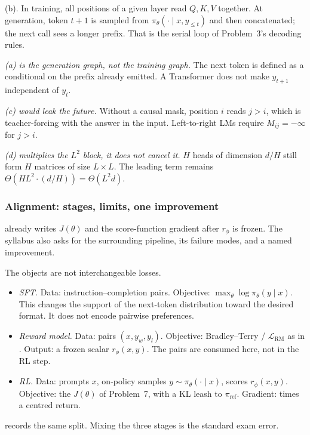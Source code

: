 \begin{solution}
(b). In training, all positions of a given layer read $Q,K,V$ together. At generation, token $t+1$ is sampled from $\pi_\theta(\cdot\mid x,y_{\le t})$ and then concatenated; the next call sees a longer prefix. That is the serial loop of Problem~3's decoding rules.

\textit{(a) is the generation graph, not the training graph.}
The next token is defined as a conditional on the prefix already emitted. A Transformer does not make $y_{t+1}$ independent of $y_t$.

\textit{(c) would leak the future.}
Without a causal mask, position $i$ reads $j>i$, which is teacher-forcing with the answer in the input. Left-to-right LMs require $M_{ij}=-\infty$ for $j>i$.

\textit{(d) multiplies the $L^2$ block, it does not cancel it.}
$H$ heads of dimension $d/H$ still form $H$ matrices of size $L\times L$. The leading term remains $\Theta(HL^2\cdot(d/H))=\Theta(L^2 d)$.
\end{solution}


\subsubsection{Alignment: stages, limits, one improvement}
\label{subsubsec:nlpu-align}

 already writes $J(\theta)$ and the score-function gradient after $r_\phi$ is frozen. The syllabus also asks for the surrounding pipeline, its failure modes, and a named improvement.

\begin{remark}
\label{rem:nlpu-three-stages}
The objects are not interchangeable losses.
\begin{itemize}
    \item \textit{SFT.} Data: instruction--completion pairs. Objective: $\max_\theta\log\pi_\theta(y\mid x)$. This changes the support of the next-token distribution toward the desired format. It does not encode pairwise preferences.
    \item \textit{Reward model.} Data: pairs $(x,y_w,y_l)$. Objective: Bradley--Terry / $\mathcal{L}_{\mathrm{RM}}$ as in . Output: a frozen scalar $r_\phi(x,y)$. The pairs are consumed here, not in the RL step.
    \item \textit{RL.} Data: prompts $x$, on-policy samples $y\sim\pi_\theta(\cdot\mid x)$, scores $r_\phi(x,y)$. Objective: the $J(\theta)$ of Problem~7, with a KL leash to $\pi_{\mathrm{ref}}$. Gradient:  times a centred return.
\end{itemize}
 records the same split. Mixing the three stages is the standard exam error.
\end{remark}

